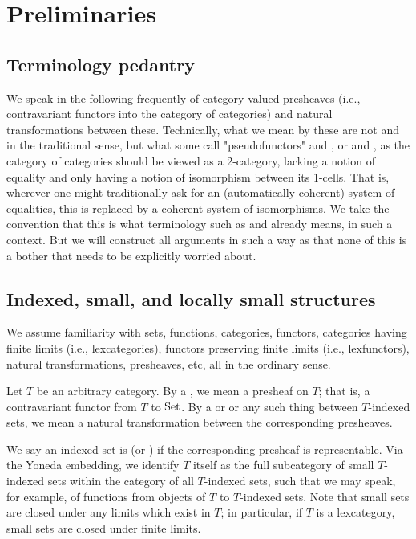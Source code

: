 \section{Preliminaries}

\subsection{Terminology pedantry}
We speak in the following frequently of category-valued presheaves (i.e., contravariant functors into the category of categories) and natural transformations between these. Technically, what we mean by these are not  and  in the traditional sense, but what some call "pseudofunctors" and , or  and , as the category of categories should be viewed as a 2-category, lacking a notion of equality and only having a notion of isomorphism between its 1-cells. That is, wherever one might traditionally ask for an (automatically coherent) system of equalities, this is replaced by a coherent system of isomorphisms. We take the convention that this is what terminology such as  and  already means, in such a context. But we will construct all arguments in such a way as that none of this is a bother that needs to be explicitly worried about.

\subsection{Indexed, small, and locally small structures}
We assume familiarity with sets, functions, categories, functors, categories having finite limits (i.e., lexcategories), functors preserving finite limits (i.e., lexfunctors), natural transformations, presheaves, etc, all in the ordinary sense.

Let $T$ be an arbitrary category. By a , we mean a presheaf on $T$; that is, a contravariant functor from $T$ to $\mathrm{Set}$. By a  or  or any such thing between $T$-indexed sets, we mean a natural transformation between the corresponding presheaves.

We say an indexed set is  (or ) if the corresponding presheaf is representable. Via the Yoneda embedding, we identify $T$ itself as the full subcategory of small $T$-indexed sets within the category of all $T$-indexed sets, such that we may speak, for example, of functions from objects of $T$ to $T$-indexed sets. Note that small sets are closed under any limits which exist in $T$; in particular, if $T$ is a lexcategory, small sets are closed under finite limits.

